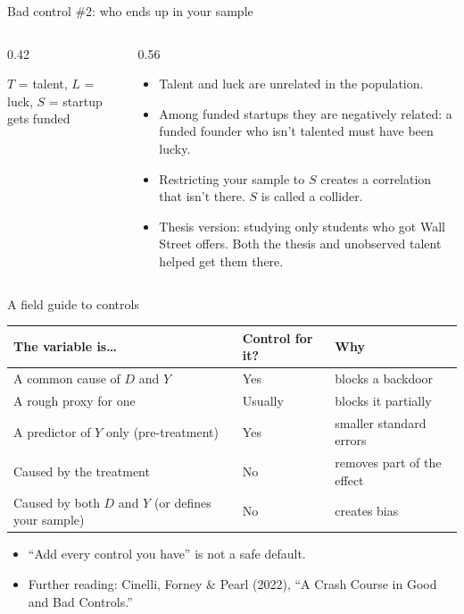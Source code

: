\documentclass[aspectratio=169,11pt]{beamer}
\begin{document}
\begin{frame}{Bad control \#2: who ends up in your sample}
\begin{columns}
\begin{column}{0.42\textwidth}
\begin{center}
\end{center}
\smallskip
{\small $T$ = talent, $L$ = luck, $S$ = startup gets funded}
\end{column}
\begin{column}{0.56\textwidth}
\begin{itemize}
	\item Talent and luck are unrelated in the population.
	\item Among \alert{funded startups} they are negatively related: a funded founder who isn't talented must have been lucky.
	\item Restricting your sample to $S$ \alert{creates} a correlation that isn't there. $S$ is called a \alert{collider}.
	\item Thesis version: studying only students who got Wall Street offers. Both the thesis and unobserved talent helped get them there.
\end{itemize}
\end{column}
\end{columns}
\end{frame}


\begin{frame}{A field guide to controls}
\begin{center}
\small
\begin{tabular}{lll}
\toprule
The variable is\ldots & Control for it? & Why \\
\midrule
A common cause of $D$ and $Y$ & \alert{Yes} & blocks a backdoor \\
A rough proxy for one & Usually & blocks it partially \\
A predictor of $Y$ only (pre-treatment) & Yes & smaller standard errors \\
Caused by the treatment & \alert{No} & removes part of the effect \\
Caused by both $D$ and $Y$ (or defines your sample) & \alert{No} & creates bias \\
\bottomrule
\end{tabular}
\end{center}
\bigskip
\begin{itemize}
	\item ``Add every control you have'' is \alert{not} a safe default.
	\item Further reading: Cinelli, Forney \& Pearl (2022), ``A Crash Course in Good and Bad Controls.''
\end{itemize}
\end{frame}
\end{document}
